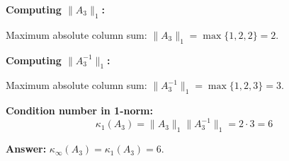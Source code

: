 \documentclass[reqno, answers]{exam}
\begin{document}
\begin{questions}
\begin{solution}
\textbf{Computing $\|A_3\|_1$:}

Maximum absolute column sum: $\|A_3\|_1 = \max\{1, 2, 2\} = 2$.

\textbf{Computing $\|A_3^{-1}\|_1$:}

Maximum absolute column sum: $\|A_3^{-1}\|_1 = \max\{1, 2, 3\} = 3$.

\textbf{Condition number in 1-norm:}
\[
\kappa_1(A_3) = \|A_3\|_1 \|A_3^{-1}\|_1 = 2 \cdot 3 = 6
\]

\textbf{Answer:} $\kappa_\infty(A_3) = \kappa_1(A_3) = 6$.
\end{solution}

\end{questions}
\end{document}
